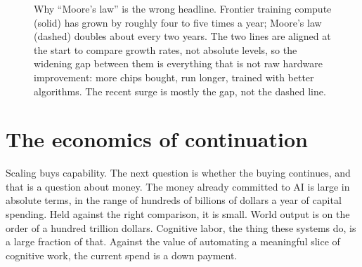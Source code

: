 \begin{figure}[h]
\centering
{}
\caption{Why ``Moore's law'' is the wrong headline. Frontier training compute (solid) has grown by roughly four to five times a year; Moore's law (dashed) doubles about every two years. The two lines are aligned at the start to compare growth rates, not absolute levels, so the widening gap between them is everything that is not raw hardware improvement: more chips bought, run longer, trained with better algorithms. The recent surge is mostly the gap, not the dashed line.}
\label{fig:compute-moore}
\end{figure}

\section*{The economics of continuation}

Scaling buys capability. The next question is whether the buying continues, and that is a question about money. The money already committed to AI is large in absolute terms, in the range of hundreds of billions of dollars a year of capital spending. Held against the right comparison, it is small. World output is on the order of a hundred trillion dollars. Cognitive labor, the thing these systems do, is a large fraction of that. Against the value of automating a meaningful slice of cognitive work, the current spend is a down payment.

